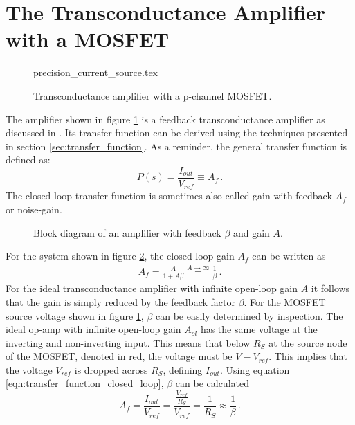 \documentclass[12pt]{book}
\begin{document}
\section{The Transconductance Amplifier with a MOSFET}
\label{sec:transfer_function_transconductance}
\begin{figure}[ht]
    \centering
    {precision_current_source.tex}
    \caption{Transconductance amplifier with a p-channel MOSFET.}
    \label{fig:transconductance_amplifier}
\end{figure}
The amplifier shown in figure \ref{fig:transconductance_amplifier} is a feedback transconductance amplifier as discussed in \cite{fet_equations}. Its transfer function can be derived using the techniques presented in section \ref{sec:transfer_function}. As a reminder, the general transfer function is defined as:
\begin{equation}
    P(s) = \frac{I_{out}}{V_{ref}} \equiv A_f \, .
\end{equation}
The closed-loop transfer function is sometimes also called gain-with-feedback $A_f$ \cite{fet_equations} or noise-gain.

\begin{figure}[ht]
    \centering
    \caption{Block diagram of an amplifier with feedback $\beta$ and gain $A$.}
    \label{fig:closed_loop_gain}
\end{figure}
For the system shown in figure \ref{fig:closed_loop_gain}, the closed-loop gain $A_f$ can be written as
\begin{align}
    A_f = \frac{A}{1 + A \beta} \overset{A \to \infty}{=} \frac 1 \beta\,. \label{eqn:transfer_function_closed_loop}
\end{align}
For the ideal transconductance amplifier with infinite open-loop gain $A$ it follows that the gain is simply reduced by the feedback factor $\beta$. For the MOSFET source voltage shown in figure \ref{fig:transconductance_amplifier}, $\beta$ can be easily determined by inspection. The ideal op-amp with infinite open-loop gain $A_{ol}$ has the same voltage at the inverting and non-inverting input. This means that below $R_S$ at the source node of the MOSFET, denoted in red, the voltage must be $V-V_{ref}$. This implies that the voltage $V_{ref}$ is dropped across $R_S$, defining $I_{out}$. Using equation \ref{eqn:transfer_function_closed_loop}, $\beta$ can be calculated
\begin{equation}
    A_f = \frac{I_{out}}{V_{ref}} = \frac{\frac{V_{ref}}{R_S}}{V_{ref}} = \frac{1}{R_S} \approx \frac 1 \beta \,. \label{eqn:transconductance_amplifier_feedback_factor}
\end{equation}
\end{document}
